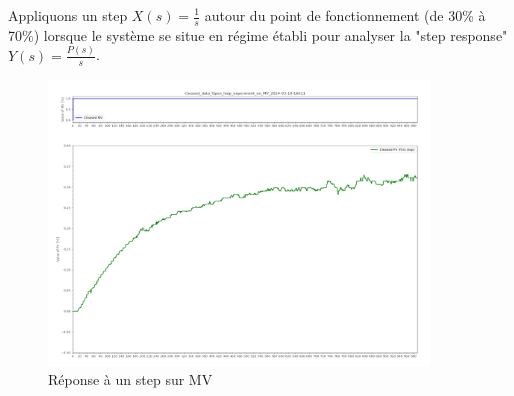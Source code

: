 Appliquons un step $X(s) = \frac{1}{s}$ autour du point de fonctionnement (de 30\% à 70\%) lorsque le système se situe en régime établi pour analyser la "step response" $Y(s) = \frac{P(s)}{s}$.
\begin{figure}[h]
    \centering
    \includegraphics[width=0.9\textwidth]{../Plots/Graphical_methods_Cleaned_data_Open_loop_experiment_on_MV_2024-03-18-16h11.png}
    \caption{Réponse à un step sur MV}
    \label{fig:MV_step_response}
\end{figure}
